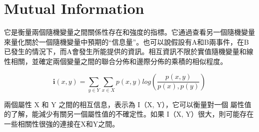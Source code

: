 \chapter{Mutual Information}
\label{chapter:intro}
它是衡量兩個隨機變量之間關係性存在和強度的指標。它通過查看另一個隨機變量來量化關於一個隨機變量中預期的“信息量”。也可以說假設有A和B兩事件，在B已發生的情況下，而A會發生所能提供的資訊。相互資訊不限於實值隨機變量和線性相關，並確定兩個變量之間的聯合分佈和邊際分佈的乘積的相似程度。



$$\textbf{i}(x,y)=\sum_{y\in Y}^{}\sum_{x\in X}^{}p(x,y)log(\frac{p(x,y)}{p(x),p(y)})$$

        兩個屬性 X 和 Y 之間的相互信息，表示為 I（X, Y），它可以衡量對一個 屬性值的了解，能減少有關另一個屬性值的不確定性。如果 I（X, Y）很大，則可能存在一些相關性很強的連接在X和Y之間。



